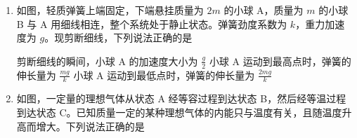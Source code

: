 \documentclass[\gkver]{gaokaozhenti}
\begin{document}
\begin{enumerate}
{选项 B 正确；

C．根据 $y = \frac{1}{2} \cdot \frac{U_{m}q}{dm}t^{2} = \frac{U_{m}l^{2}}{4dU_{1}}$

若其它条件不变，要增加样品的辐照范围，则需减小 $U_{1}$，选项 C 错误；

D．由图可知 $t_{1}$ 时刻所加的向上电场电压小于 $t_{2}$ 时刻所加的向下的电场的电压，则 $t_{1}$ 时刻射入的粒子打到 A 点时的竖直位移小于打到 B 点时的竖直位移，则选项 D 错误。故选 B。
}

\item
如图，轻质弹簧上端固定，下端悬挂质量为 $2m$ 的小球 A，质量为 $m$ 的小球 B 与 A 用细线相连，整个系统处于静止状态。弹簧劲度系数为 $k$，重力加速度为 $g$。现剪断细线，下列说法正确的是

\onepicture[h=5.80cm]{}

{剪断细线的瞬间，小球 A 的加速度大小为 $\frac{g}{2}$}
{小球 A 运动到最高点时，弹簧的伸长量为 $\frac{mg}{k}$}
{小球 A 运动到最低点时，弹簧的伸长量为 $\frac{2mg}{k}$}


\item
如图，一定量的理想气体从状态 A 经等容过程到达状态 B，然后经等温过程到达状态 C。已知质量一定的某种理想气体的内能只与温度有关，且随温度升高而增大。下列说法正确的是


\end{enumerate}
\end{document}
